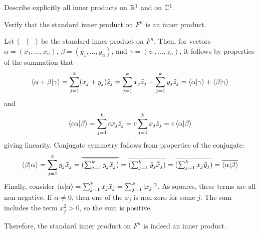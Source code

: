 \documentclass{agony}
\begin{document}
\begin{xca}
  Describe explicitly all inner products on $\mathbb{R}^1$ and on $\mathbb{C}^1$.
\end{xca}

\begin{xca}
  Verify that the standard inner product on $F^n$ is an inner product.
\end{xca}
\begin{prf}
  Let $\ip{\quad}$ be the standard inner product on $F^n$.
  Then, for vectors $\alpha = (x_1,\dotsc,x_n)$,
  $\beta = (y_1,\dotsc,y_n)$, and $\gamma = (z_1,\dotsc,z_n)$,
  it follows by properties of the summation that
  \[
    \ip{\alpha+\beta}{\gamma} = \sum_{j=1}^k (x_j+y_j)\bar z_j
    = \sum_{j=1}^k x_j \bar z_j + \sum_{j=1}^k y_j \bar z_j
    = \ip{\alpha}{\gamma} + \ip{\beta}{\gamma}
  \]
  and
  \[
    \ip{c\alpha}{\beta} = \sum_{j=1}^k cx_j\bar z_j
    = c\sum_{j=1}^k x_j \bar z_j
    = c\ip{\alpha}{\beta}
  \]
  giving linearity. Conjugate symmetry follows from properties of the conjugate:
  \[
    \ip{\beta}{\alpha} = \sum_{j=1}^k y_j \bar x_j
    = \overline{(\overline{\textstyle\sum_{j=1}^k y_j \bar x_j})}
    = \overline{(\textstyle\sum_{j=1}^k \bar y_j \bar{\bar{x}}_j)}
    = \overline{(\textstyle\sum_{j=1}^k x_j \bar y_j)}
    = \overline{\ip{\alpha}{\beta}}
  \]
  Finally, consider $\ip{\alpha} = \sum_{j=1}^k x_j \bar x_j = \sum_{j=1}^k |x_j|^2$.
  As squares, these terms are all non-negative.
  If $\alpha \neq 0$, then one of the $x_j$ is non-zero for some $j$.
  The sum includes the term $x_j^2 > 0$, so the sum is positive.

  Therefore, the standard inner product on $F^n$ is indeed an inner product.
\end{prf}
\end{document}
